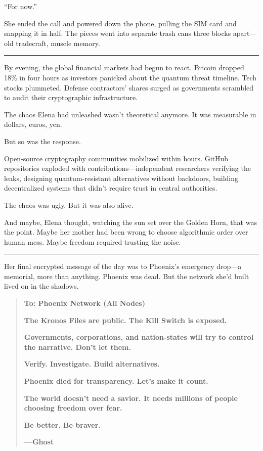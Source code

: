 ``For now.''

She ended the call and powered down the phone, pulling the SIM card and snapping it in half. The pieces went into separate trash cans three blocks apart---old tradecraft, muscle memory.

\begin{center}\rule{0.5\linewidth}{0.5pt}\end{center}

By evening, the global financial markets had begun to react. Bitcoin dropped 18\% in four hours as investors panicked about the quantum threat timeline. Tech stocks plummeted. Defense contractors' shares surged as governments scrambled to audit their cryptographic infrastructure.

The chaos Elena had unleashed wasn't theoretical anymore. It was measurable in dollars, euros, yen.

But so was the response.

Open-source cryptography communities mobilized within hours. GitHub repositories exploded with contributions---independent researchers verifying the leaks, designing quantum-resistant alternatives without backdoors, building decentralized systems that didn't require trust in central authorities.

The chaos was ugly. But it was also alive.

And maybe, Elena thought, watching the sun set over the Golden Horn, that was the point. Maybe her mother had been wrong to choose algorithmic order over human mess. Maybe freedom required trusting the noise.

\begin{center}\rule{0.5\linewidth}{0.5pt}\end{center}

Her final encrypted message of the day was to Phoenix's emergency drop---a memorial, more than anything. Phoenix was dead. But the network she'd built lived on in the shadows.

\begin{quote}
\textbf{To: Phoenix Network (All Nodes)}

\textbf{The Kronos Files are public. The Kill Switch is exposed.}

\textbf{Governments, corporations, and nation-states will try to control the narrative. Don't let them.}

\textbf{Verify. Investigate. Build alternatives.}

\textbf{Phoenix died for transparency. Let's make it count.}

\textbf{The world doesn't need a savior. It needs millions of people choosing freedom over fear.}

\textbf{Be better. Be braver.}

\textbf{---Ghost}
\end{quote}

